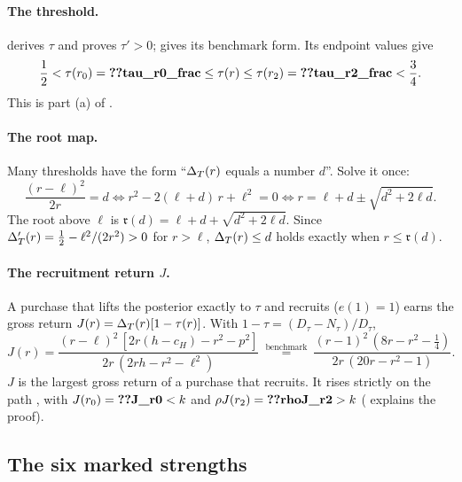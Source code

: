 \paragraph{The threshold.}
 derives \(\tau\) and proves \(\tau'>0\);  gives its benchmark form.
Its endpoint values give
\[
\frac12<\tau(r_0)=\reg{tau_r0_frac}\le\tau(r)\le\tau(r_2)=\reg{tau_r2_frac}<\frac34.
\]
This is part (a) of .

\paragraph{The root map.} Many thresholds have the form ``\(\Delta_T(r)\) equals a number \(d\)''. Solve it once:
\[
\frac{(r-\ell)^2}{2r}=d\iff r^2-2(\ell+d)\,r+\ell^2=0\iff r=\ell+d\pm\sqrt{d^2+2\ell d}.
\]
The root above \(\ell\) is \(\mathfrak r(d)=\ell+d+\sqrt{d^2+2\ell d}\). Since \(\Delta_T'(r)=\tfrac12-\ell^2/(2r^2)>0\) for
\(r>\ell\), \(\Delta_T(r)\le d\) holds exactly when \(r\le\mathfrak r(d)\).

\paragraph{The recruitment return \(J\).} A purchase that lifts the posterior exactly to \(\tau\) and recruits
(\(e(1)=1\)) earns the gross return \(J(r)=\Delta_T(r)[1-\tau(r)]\). With \(1-\tau=(D_\tau-N_\tau)/D_\tau\),
\[
J(r)=\frac{(r-\ell)^2\,[2r(h-c_H)-r^2-p^2]}{2r\,(2rh-r^2-\ell^2)}
\ \overset{\text{benchmark}}{=}\ \frac{(r-1)^2\,(8r-r^2-\tfrac14)}{2r\,(20r-r^2-1)} .
\]
\(J\) is the largest gross return of a purchase that recruits. It rises strictly on the path
, with \(J(r_0)=\reg{J_r0}<k\) and \(\rho J(r_2)=\reg{rhoJ_r2}>k\)
( explains the proof).

\subsection{The six marked strengths}\label{sec:08_coexistence-thresholds}

